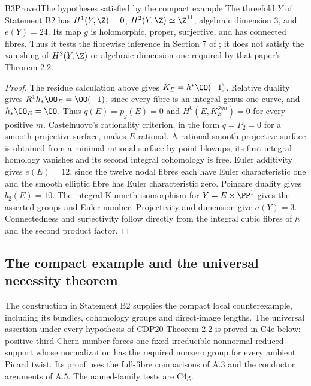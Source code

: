 \begin{statement}{B3}{Proved}{The hypotheses satisfied by the compact example}
The threefold $Y$ of Statement B2 has $H^1(Y,\Z)=0$, $H^2(Y,\Z)\simeq\Z^{11}$, algebraic dimension $3$, and $e(Y)=24$. Its map $g$ is holomorphic, proper, surjective, and has connected fibres. Thus it tests the fibrewise inference in Section 7 of \cite{CDP20}; it does not satisfy the vanishing of $H^2(Y,\Z)$ or algebraic dimension one required by that paper's Theorem 2.2.
\end{statement}
\begin{proof}
The residue calculation above gives $K_E=h^*\OO(-1)$. Relative duality gives $R^1h_*\OO_E=\OO(-1)$, since every fibre is an integral genus-one curve, and $h_*\OO_E=\OO$. Thus $q(E)=p_g(E)=0$ and $H^0(E,K_E^{\otimes m})=0$ for every positive $m$. Castelnuovo's rationality criterion, in the form $q=P_2=0$ for a smooth projective surface, makes $E$ rational. A rational smooth projective surface is obtained from a minimal rational surface by point blowups; its first integral homology vanishes and its second integral cohomology is free. Euler additivity gives $e(E)=12$, since the twelve nodal fibres each have Euler characteristic one and the smooth elliptic fibre has Euler characteristic zero. Poincare duality gives $b_2(E)=10$. The integral Kunneth isomorphism for $Y=E\times\PP^1$ gives the asserted groups and Euler number. Projectivity and dimension give $a(Y)=3$. Connectedness and surjectivity follow directly from the integral cubic fibres of $h$ and the second product factor.
\end{proof}

\subsection{The compact example and the universal necessity theorem}

The construction in Statement B2 supplies the compact local counterexample, including its bundles, cohomology groups and direct-image lengths. The universal assertion under every hypothesis of CDP20 Theorem 2.2 is proved in C4e below: positive third Chern number forces one fixed irreducible nonnormal reduced support whose normalization has the required nonzero group for every ambient Picard twist. Its proof uses the full-fibre comparisons of A.3 and the conductor arguments of A.5. The named-family tests are C4g.
